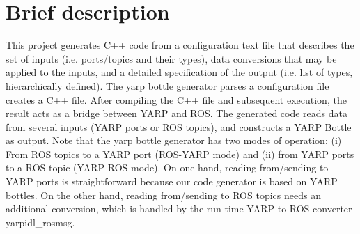 \hypertarget{index_intro_sec}{}\section{Brief description}\label{index_intro_sec}
This project generates C++ code from a configuration text file that describes the set of inputs (i.\-e. ports/topics and their types), data conversions that may be applied to the inputs, and a detailed specification of the output (i.\-e. list of types, hierarchically defined). The yarp bottle generator parses a configuration file creates a C++ file. After compiling the C++ file and subsequent execution, the result acts as a bridge between Y\-A\-R\-P and R\-O\-S. The generated code reads data from several inputs (Y\-A\-R\-P ports or R\-O\-S topics), and constructs a Y\-A\-R\-P Bottle as output. Note that the yarp bottle generator has two modes of operation\-: (i) From R\-O\-S topics to a Y\-A\-R\-P port (R\-O\-S-\/\-Y\-A\-R\-P mode) and (ii) from Y\-A\-R\-P ports to a R\-O\-S topic (Y\-A\-R\-P-\/\-R\-O\-S mode). On one hand, reading from/sending to Y\-A\-R\-P ports is straightforward because our code generator is based on Y\-A\-R\-P bottles. On the other hand, reading from/sending to R\-O\-S topics needs an additional conversion, which is handled by the run-\/time Y\-A\-R\-P to R\-O\-S converter yarpidl\-\_\-rosmsg. 